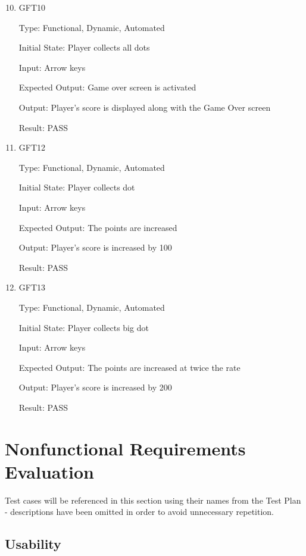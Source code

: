 \documentclass[12pt, titlepage]{article}
\begin{document}
\begin{enumerate}
\setcounter{enumi}{9}
\item{\label{gft10}{GFT10}\\}

Type: Functional, Dynamic, Automated
					
Initial State: Player collects all dots
					
Input: Arrow keys
					
Expected Output: Game over screen is activated

Output: Player's score is displayed along with the Game Over screen

Result: PASS
\setcounter{enumi}{11}
\item{\label{gft12}{GFT12}\\}

Type: Functional, Dynamic, Automated
					
Initial State: Player collects dot
					
Input: Arrow keys
					
Expected Output: The points are increased

Output: Player's score is increased by 100

Result: PASS

\item{\label{gft13}{GFT13}\\}

Type: Functional, Dynamic, Automated
					
Initial State: Player collects big dot
					
Input: Arrow keys
					
Expected Output: The points are increased at twice the rate

Output: Player's score is increased by 200

Result: PASS

\end{enumerate}

\section{Nonfunctional Requirements Evaluation}

Test cases will be referenced in this section using their names from the Test Plan - descriptions have been omitted in order to avoid unnecessary repetition.

\subsection{Usability}
\end{document}
